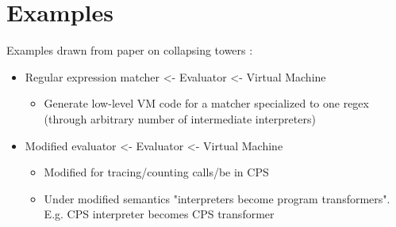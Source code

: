 \documentclass{article}
\begin{document}
\section{Examples}
Examples drawn from paper on collapsing towers \cite{amin2017collapsing}:
\begin{itemize}
	\item Regular expression matcher <- Evaluator <- Virtual Machine
	\begin{itemize}
		\item Generate low-level VM code for a matcher specialized to one regex (through arbitrary number of intermediate interpreters)
	\end{itemize}
	\item Modified evaluator <- Evaluator <- Virtual Machine
	\begin{itemize}
		\item Modified for tracing/counting calls/be in CPS
		\item Under modified semantics "interpreters become program transformers". E.g. CPS interpreter becomes CPS transformer
	\end{itemize}
\end{itemize}
\end{document}
